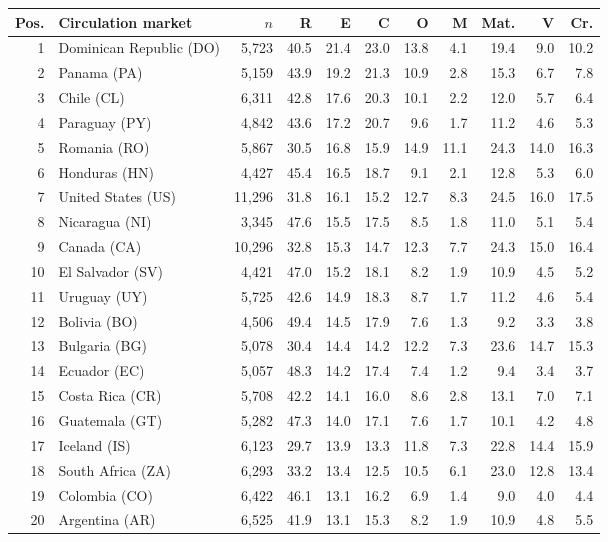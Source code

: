 \documentclass[10pt,a4paper,twocolumn]{article}
\begin{document}
\begin{tabular}{@{}rlrrrrrrrrr@{}}
\toprule Pos. & Circulation market & $n$ & R & E & C & O & M & Mat. & V & Cr. \\
\midrule
1 & Dominican Republic (DO) & 5,723 & 40.5 & 21.4 & 23.0 & 13.8 & 4.1 & 19.4 & 9.0 & 10.2 \\
2 & Panama (PA) & 5,159 & 43.9 & 19.2 & 21.3 & 10.9 & 2.8 & 15.3 & 6.7 & 7.8 \\
3 & Chile (CL) & 6,311 & 42.8 & 17.6 & 20.3 & 10.1 & 2.2 & 12.0 & 5.7 & 6.4 \\
4 & Paraguay (PY) & 4,842 & 43.6 & 17.2 & 20.7 & 9.6 & 1.7 & 11.2 & 4.6 & 5.3 \\
5 & Romania (RO) & 5,867 & 30.5 & 16.8 & 15.9 & 14.9 & 11.1 & 24.3 & 14.0 & 16.3 \\
6 & Honduras (HN) & 4,427 & 45.4 & 16.5 & 18.7 & 9.1 & 2.1 & 12.8 & 5.3 & 6.0 \\
7 & United States (US) & 11,296 & 31.8 & 16.1 & 15.2 & 12.7 & 8.3 & 24.5 & 16.0 & 17.5 \\
8 & Nicaragua (NI) & 3,345 & 47.6 & 15.5 & 17.5 & 8.5 & 1.8 & 11.0 & 5.1 & 5.4 \\
9 & Canada (CA) & 10,296 & 32.8 & 15.3 & 14.7 & 12.3 & 7.7 & 24.3 & 15.0 & 16.4 \\
10 & El Salvador (SV) & 4,421 & 47.0 & 15.2 & 18.1 & 8.2 & 1.9 & 10.9 & 4.5 & 5.2 \\
11 & Uruguay (UY) & 5,725 & 42.6 & 14.9 & 18.3 & 8.7 & 1.7 & 11.2 & 4.6 & 5.4 \\
12 & Bolivia (BO) & 4,506 & 49.4 & 14.5 & 17.9 & 7.6 & 1.3 & 9.2 & 3.3 & 3.8 \\
13 & Bulgaria (BG) & 5,078 & 30.4 & 14.4 & 14.2 & 12.2 & 7.3 & 23.6 & 14.7 & 15.3 \\
14 & Ecuador (EC) & 5,057 & 48.3 & 14.2 & 17.4 & 7.4 & 1.2 & 9.4 & 3.4 & 3.7 \\
15 & Costa Rica (CR) & 5,708 & 42.2 & 14.1 & 16.0 & 8.6 & 2.8 & 13.1 & 7.0 & 7.1 \\
16 & Guatemala (GT) & 5,282 & 47.3 & 14.0 & 17.1 & 7.6 & 1.7 & 10.1 & 4.2 & 4.8 \\
17 & Iceland (IS) & 6,123 & 29.7 & 13.9 & 13.3 & 11.8 & 7.3 & 22.8 & 14.4 & 15.9 \\
18 & South Africa (ZA) & 6,293 & 33.2 & 13.4 & 12.5 & 10.5 & 6.1 & 23.0 & 12.8 & 13.4 \\
19 & Colombia (CO) & 6,422 & 46.1 & 13.1 & 16.2 & 6.9 & 1.4 & 9.0 & 4.0 & 4.4 \\
20 & Argentina (AR) & 6,525 & 41.9 & 13.1 & 15.3 & 8.2 & 1.9 & 10.9 & 4.8 & 5.5 \\

\end{tabular}
\end{document}
